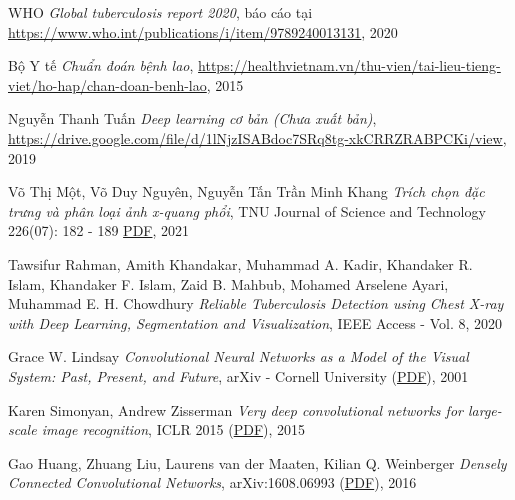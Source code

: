 \begin{thebibliography}{99}
	 WHO {\it Global tuberculosis report 2020}, báo cáo tại \href{https://www.who.int/publications/i/item/9789240013131}{ https://www.who.int/publications/i/item/9789240013131}, 2020
	
	 Bộ Y tế {\it Chuẩn đoán bệnh lao}, \href{https://healthvietnam.vn/thu-vien/tai-lieu-tieng-viet/ho-hap/chan-doan-benh-lao}{https://healthvietnam.vn/thu-vien/tai-lieu-tieng-viet/ho-hap/chan-doan-benh-lao}, 2015
	
	
	 Nguyễn Thanh Tuấn {\it Deep learning cơ bản (Chưa xuất bản)}, \href{https://drive.google.com/file/d/1lNjzISABdoc7SRq8tg-xkCRRZRABPCKi/view}{https://drive.google.com/file/d/1lNjzISABdoc7SRq8tg-xkCRRZRABPCKi/view}, 2019
	
	 Võ Thị Một, Võ Duy Nguyên, Nguyễn Tấn Trần Minh Khang {\it Trích chọn đặc trưng và phân loại ảnh x-quang phổi}, TNU Journal of Science and Technology 226(07): 182 - 189 {\href{http://jst.tnu.edu.vn/jst/article/viewFile/3974/pdf}{PDF}}, 2021
	
	 Tawsifur Rahman, Amith Khandakar, Muhammad A. Kadir, Khandaker R. Islam, Khandaker F. Islam, Zaid B. Mahbub, Mohamed Arselene Ayari, Muhammad E. H. Chowdhury {\it Reliable Tuberculosis Detection using Chest X-ray with Deep Learning, Segmentation and Visualization}, IEEE Access - Vol. 8, 2020
	
	 Grace W. Lindsay {\it Convolutional Neural Networks as a Model of the Visual System: Past, Present, and Future}, arXiv - Cornell University (\href{https://arxiv.org/ftp/arxiv/papers/2001/2001.07092.pdf}{PDF}), 2001
	
	 Karen Simonyan, Andrew Zisserman {\it Very deep convolutional networks for large-scale image recognition}, ICLR 2015 (\href{https://arxiv.org/pdf/1409.1556.pdf}{PDF}), 2015
	
	 Gao Huang, Zhuang Liu, Laurens van der Maaten, Kilian Q. Weinberger {\it Densely Connected Convolutional Networks}, arXiv:1608.06993 (\href{https://arxiv.org/pdf/1608.06993.pdf}{PDF}), 2016 
	  
\end{thebibliography}
